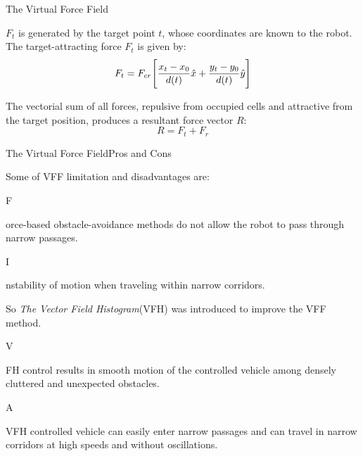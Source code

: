 \documentclass[8pt]{beamer}
\newcommand{\Ytri}{$\triangleright$ }
\renewcommand{\|}[1][.3em]{\hspace{#1}|\hspace{#1}}
\renewcommand{\,}[1][.3em]{,\hspace{#1}}
\newcommand{\subitem}[1]{{\setlength\itemindent{12pt}\item[\Ytri] #1}}
\newcommand{\morespace}{\setlength\itemsep{1em}}
\begin{document}
\begin{frame}{The Virtual Force Field}
\begin{itemize}
{\item $F_t$ is generated by the target point $t$, whose coordinates are known to the robot. The target-attracting force $F_t$ is given by:
\begin{equation}
F_t = F_{cr}\Bigg[{x_t - x_0 \over d(t)}\hat{x} + {y_t - y_0 \over d(t)}\hat{y}\Bigg] 
\end{equation}
\item The vectorial sum of all forces, repulsive from occupied cells and attractive from the target position, produces a resultant force vector $R$:
\begin{equation}
R = F_t + F_r
\end{equation}
}
\end{itemize}
\end{frame}
\begin{frame}{The Virtual Force Field}{Pros and Cons}
\begin{itemize}
\morespace
\item Some of VFF limitation and disadvantages are\cite{borenstein1991vector}:
    \subitem Force-based obstacle-avoidance methods do not allow the robot to pass through narrow passages.
    \subitem Instability of motion when traveling within narrow corridors.
\item So \emph{The Vector Field Histogram}(VFH) was introduced to improve the VFF method.
    \subitem VFH control results in smooth motion of the controlled vehicle among densely cluttered and unexpected obstacles.
    \subitem A VFH controlled vehicle can easily enter narrow passages and can travel in narrow corridors at high speeds and without oscillations.
\end{itemize}
\end{frame}
\end{document}
